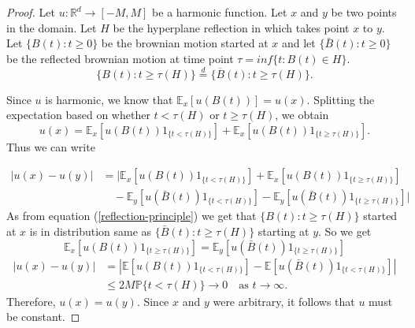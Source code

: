 \documentclass{article}
\numberwithin{equation}{section}
\begin{document}
\begin{proof}
Let \(u : \mathbb{R}^d \to [-M,M]\) be a harmonic function. Let \(x\) and \(y\) be two points in the domain. Let \(H\) be the hyperplane reflection in which takes point \(x\) to \(y\). Let \(\{B(t) : t \geq 0\}\) be the brownian motion started at \(x\) and let  \(\{\bar{B}(t) : t \geq 0\}\) be the reflected brownian motion at time point \(\tau = inf \{t : B(t) \in H\}\). 
\begin{equation}\label{reflection-principle}
\{B(t) : t \geq \tau(H)\} \overset{d}{=} \{\overline{B}(t) : t \geq \tau(H)\}. 
\end{equation}

Since \( u \) is harmonic, we know that \( \mathbb{E}_x[u(B(t))] = u(x) \). Splitting the expectation based on whether \( t < \tau(H) \) or \( t \geq \tau(H) \), we obtain
\[
u(x) = \mathbb{E}_x\left[u(B(t)) {1}_{\{t < \tau(H)\}} \right] + \mathbb{E}_x\left[u(B(t)) {1}_{\{t \geq \tau(H)\}} \right].
\]
Thus we can write 

\begin{align*}
|u(x)-u(y)| 
&= \Big| \mathbb{E}_x\left[u(B(t)) {1}_{\{t < \tau(H)\}} \right] 
+ \mathbb{E}_x\left[u(B(t)) {1}_{\{t \geq \tau(H)\}}\right] \\
&\quad - \mathbb{E}_y\left[u(\bar{B}(t)) {1}_{\{t < \tau(H)\}} \right] 
- \mathbb{E}_y\left[u(\bar{B}(t)) {1}_{\{t \geq \tau(H)\}} \right] \Big|
\end{align*}
\noindent As from equation (\ref{reflection-principle}) we get that \(\{B(t) : t \geq \tau(H)\}\) started at \(x\) is in distribution same as \(\{\bar{B}(t) : t \geq \tau(H)\}\) starting at \(y\). So we get 
\[
\mathbb{E}_x\left[u(B(t)) {1}_{\{t \geq \tau(H)\}}\right] = \mathbb{E}_y\left[u(\bar{B}(t)) {1}_{\{t \geq \tau(H)\}} \right] 
\]
\begin{align*}
|u(x) - u(y)| 
&= \left| \mathbb{E}\left[u(B(t)) {1}_{\{t < \tau(H)\}}\right] 
- \mathbb{E}\left[u(\bar{B}(t)) {1}_{\{t < \tau(H)\}}\right] \right| \\
&\leq 2M \mathbb{P}\{t < \tau(H)\} \longrightarrow 0 \quad \text{as } t \to \infty.
\end{align*}
Therefore, \( u(x) = u(y) \). Since \( x \) and \( y \) were arbitrary, it follows that \( u \) must be constant.


\end{proof}


\end{document}
